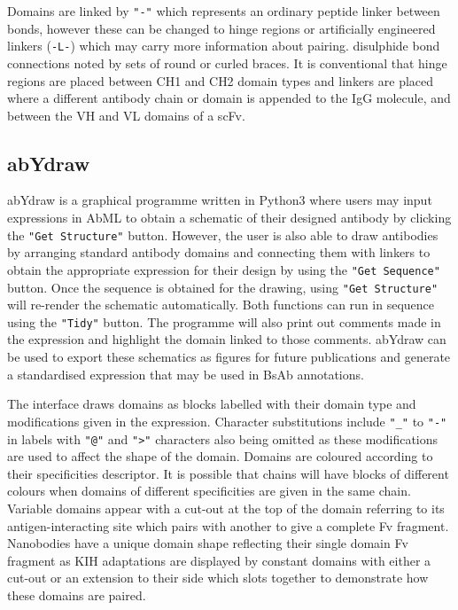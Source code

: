 \documentclass{article}
\begin{document}
Domains are linked by \verb|"-"| which represents an ordinary peptide linker
between bonds, however these can be changed to hinge regions or
artificially engineered linkers (\verb|-L-|) which may carry more information
about pairing. disulphide bond connections noted by sets of round or
curled braces. It is conventional that hinge regions are placed
between CH1 and CH2 domain types and linkers are placed where a
different antibody chain or domain is appended to the IgG molecule,
and between the VH and VL domains of a scFv.  

\subsection{abYdraw}
abYdraw is a graphical programme written in Python3 where users may
input expressions in AbML to obtain a schematic of their designed
antibody by clicking the \verb|"Get Structure"| button. However, the user is
also able to draw antibodies by arranging standard antibody domains
and connecting them with linkers to obtain the appropriate expression
for their design by using the \verb|"Get Sequence"| button. Once the sequence
is obtained for the drawing, using \verb|"Get Structure"| will re-render the
schematic automatically. Both functions can run in sequence using the
\verb|"Tidy"| button. The programme will also print out comments made in the
expression and highlight the domain linked to those comments. abYdraw
can be used to export these schematics as figures for future
publications and generate a standardised expression that may be used
in BsAb annotations.  

The interface draws domains as blocks labelled with their domain type
and modifications given in the expression. Character substitutions
include \verb|"_"| to \verb|"-"| in labels with \verb|"@"| and
\verb|">"| characters also being omitted as these modifications are
used to affect the shape of the domain. Domains are coloured according
to their specificities descriptor. It is possible that chains will
have blocks of different colours when domains of different
specificities are given in the same chain. Variable domains appear
with a cut-out at the top of the domain referring to its
antigen-interacting site which pairs with another to give a complete
Fv fragment. Nanobodies have a unique domain shape reflecting their
single domain Fv fragment as KIH adaptations are displayed by constant
domains with either a cut-out or an extension to their side which
slots together to demonstrate how these domains are paired.
\end{document}
